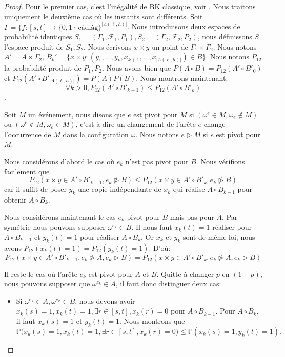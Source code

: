 \documentclass[titlepage,a4paper,12pt]{article}
\begin{document}
\begin{proof}
Pour le premier cas, c'est l'inégalité de BK classique, voir \cite{grimmett1999percolation}. Nous traitons uniquement le deuxième cas où les instants sont différents. Soit $\Gamma = \{f:[s,t]\rightarrow\{0,1\}\text{ càdlàg} \}^{|\Lambda(\ell,h)|}$. Nous introduisons deux espaces de probabilité identiques $S_1 = (\Gamma_1,\mathcal{F}_1,P_1), S_2 = (\Gamma_2,\mathcal{F}_2,P_2)$, nous définissons $S$ l'espace produit de $S_1,S_2$. Nous écrivons $x\times y$ un point de $\Gamma_1 \times \Gamma_2$. Nous notons $A' = A\times \Gamma_2$, $B_k' = \{x\times y :(y_1,\dots,y_k,x_{k+1},\dots,x_{|\Lambda(\ell,h)|}) \in B\}$. Nous notons $P_{12}$ la probabilité produit de $P_1,P_2$. Nous avons bien que $P(A\circ B) = P_{12}(A'\circ B'_0)$ et $P_{12}(A'\circ B'_{|\Lambda(\ell,h)|}) = P(A)P(B)$. Nous montrons maintenant: $$\forall k>0, P_{12}(A'\circ B'_{k-1}) \leqslant P_{12}(A'\circ B'_k)$$. 

Soit $M$ un événement, nous disons que $e$ est pivot pour $M$ si $(\omega^e \in M, \omega_e\notin M)$ ou $(\omega^e \notin M, \omega_e\in M)$, c'est à dire un changement de l'arête $e$ change l'occurrence de $M$ dans la configuration $\omega$. Nous notons $e\triangleright M$ si $e$ est pivot pour $M$.

Nous considérons d'abord le cas où $e_k$ n'est pas pivot pour $B$. Nous vérifions facilement que 
$$ P_{12}(x\times y \in A'\circ B'_{k-1}, e_k \ntriangleright B) \leqslant P_{12}(x\times y \in A'\circ B'_k,e_k \ntriangleright B)
$$
car il suffit de poser $y_k$ une copie indépendante de $x_k$ qui réalise $A\circ B_{k-1}$ pour obtenir $A\circ B_k$.

Nous considérons maintenant le cas $e_k$ pivot pour $B$ mais pas pour $A$. Par symétrie nous pouvons supposer $ \omega^{e_k}\in B$. Il nous faut $x_k(t)=1$ réaliser pour $A\circ B_{k-1}$ et $y_k(t)= 1$ pour réaliser $A\circ B_k$. Or $x_k$ et $y_k$ sont de même loi, nous avons $P_{12}(x_k(t)=1) = P_{12}(y_k(t)=1)$. D'où:
$$P_{12}(x\times y \in A'\circ B'_{k-1}, e_k \ntriangleright A,e_k \triangleright B) = P_{12}(x\times y \in A'\circ B'_k,e_k \ntriangleright A, e_k \triangleright B)
$$

Il reste le cas où l'arête $e_k$ est pivot pour $A$ et $B$. Quitte à changer $p$ en $(1-p)$, nous pouvons supposer que $\omega^{e_k}\in A$, il faut donc distinguer deux cas:
\begin{itemize}[label = $\bullet$, leftmargin = *]
\item Si $\omega^{e_k}\in A, \omega^{e_k}\in B$, nous devons avoir $x_k(s) = 1, x_k(t) =1, \exists r\in [s,t], x_k(r) = 0$ pour $A\circ B_{k-1}$. Pour $A\circ B_k$, il faut $x_k(s)=1$ et $y_k(t)=1$. Nous montrons que $$\mathbb{P}\big(x_k(s) = 1, x_k(t) =1, \exists r\in [s,t], x_k(r) = 0\big)\leqslant \mathbb{P}(x_k(s)=1,y_k(t)=1).$$


\end{itemize}
\end{proof}
\end{document}
